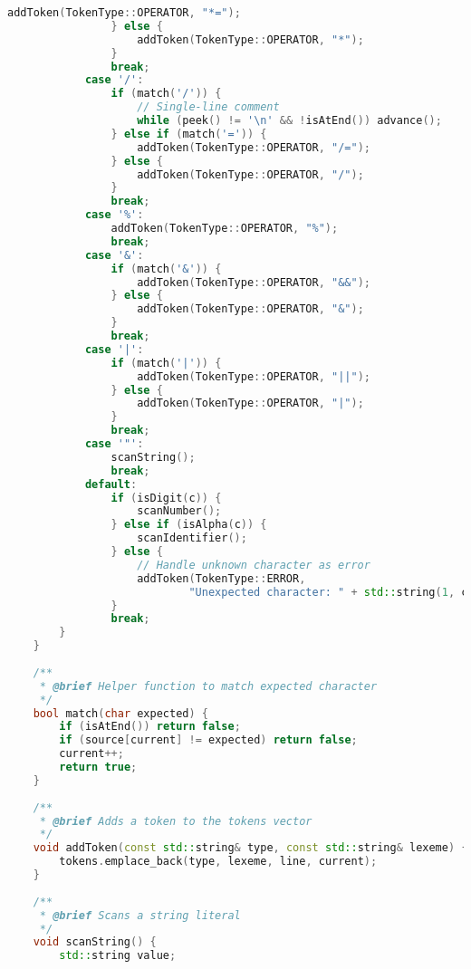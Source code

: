 \documentclass[12pt,a4paper]{article}
\begin{document}
\begin{lstlisting}[language=C++, caption=Lexical Analyzer Implementation]
                    addToken(TokenType::OPERATOR, "*=");
                } else {
                    addToken(TokenType::OPERATOR, "*");
                }
                break;
            case '/':
                if (match('/')) {
                    // Single-line comment
                    while (peek() != '\n' && !isAtEnd()) advance();
                } else if (match('=')) {
                    addToken(TokenType::OPERATOR, "/=");
                } else {
                    addToken(TokenType::OPERATOR, "/");
                }
                break;
            case '%':
                addToken(TokenType::OPERATOR, "%");
                break;
            case '&':
                if (match('&')) {
                    addToken(TokenType::OPERATOR, "&&");
                } else {
                    addToken(TokenType::OPERATOR, "&");
                }
                break;
            case '|':
                if (match('|')) {
                    addToken(TokenType::OPERATOR, "||");
                } else {
                    addToken(TokenType::OPERATOR, "|");
                }
                break;
            case '"':
                scanString();
                break;
            default:
                if (isDigit(c)) {
                    scanNumber();
                } else if (isAlpha(c)) {
                    scanIdentifier();
                } else {
                    // Handle unknown character as error
                    addToken(TokenType::ERROR, 
                            "Unexpected character: " + std::string(1, c));
                }
                break;
        }
    }
    
    /**
     * @brief Helper function to match expected character
     */
    bool match(char expected) {
        if (isAtEnd()) return false;
        if (source[current] != expected) return false;
        current++;
        return true;
    }
    
    /**
     * @brief Adds a token to the tokens vector
     */
    void addToken(const std::string& type, const std::string& lexeme) {
        tokens.emplace_back(type, lexeme, line, current);
    }
    
    /**
     * @brief Scans a string literal
     */
    void scanString() {
        std::string value;
        

\end{lstlisting}
\end{document}
